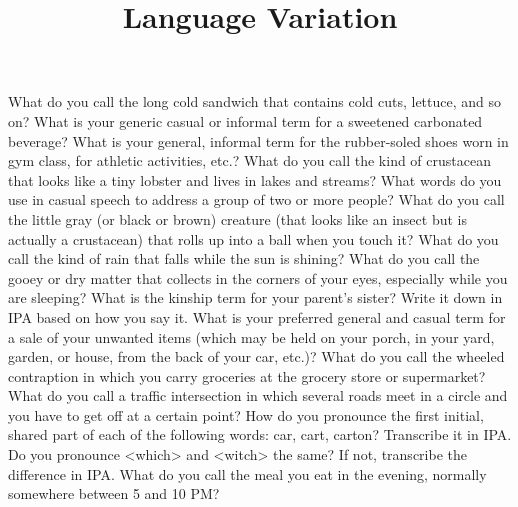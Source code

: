 \documentclass[addpoints]{exam}
\title{Language Variation}
\date{}
\begin{document}
  \maketitle

  


  \begin{questions}
    \question What do you call the long cold sandwich that contains cold cuts, lettuce, and so on? \hrulefill
    \question What is your generic casual or informal term for a sweetened carbonated beverage? \hrulefill
    \question What is your general, informal term for the rubber-soled shoes worn in gym class, for athletic activities, etc.? \hrulefill
    \question What do you call the kind of crustacean that looks like a tiny lobster and lives in lakes and streams? \hrulefill
    \question What words do you use in casual speech to address a group of two or more people? \hrulefill
    \question What do you call the little gray (or black or brown) creature (that looks like an insect but is actually a crustacean) that rolls up into a ball when you touch it? \hrulefill
    \question What do you call the kind of rain that falls while the sun is shining? \hrulefill
    \question What do you call the gooey or dry matter that collects in the corners of your eyes, especially while you are sleeping? \hrulefill
    \question What is the kinship term for your parent's sister? Write it down in IPA based on how you say it. \hrulefill
    \question What is your preferred general and casual term for a sale of your unwanted items (which may be held on your porch, in your yard, garden, or house, from the back of your car, etc.)? \hrulefill
    \question What do you call the wheeled contraption in which you carry groceries at the grocery store or supermarket? \hrulefill
    \question What do you call a traffic intersection in which several roads meet in a circle and you have to get off at a certain point? \hrulefill
    \question How do you pronounce the first initial, shared part of each of the following words: car, cart, carton? Transcribe it in IPA. \hrulefill
    \question Do you pronounce <which> and <witch> the same? If not, transcribe the difference in IPA. \hrulefill
    \question What do you call the meal you eat in the evening, normally somewhere between 5 and 10 PM? \hrulefill

\end{questions}
\end{document}
